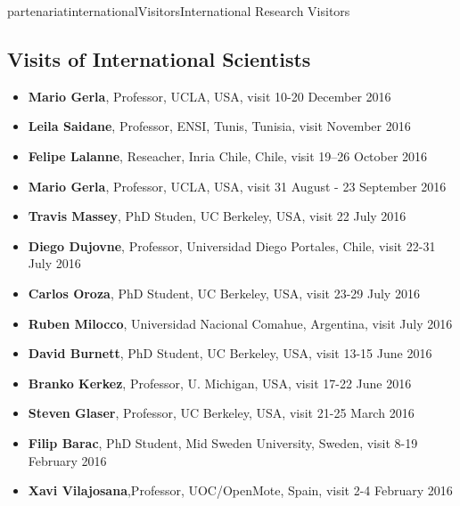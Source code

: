 \documentclass{ra2016}
\begin{document}
\begin{module}{partenariat}{internationalVisitors}{International Research Visitors}


\subsection{Visits of International Scientists}


\begin{itemize}
    \item{\bf Mario Gerla},    Professor,   UCLA,                       USA,       visit 10-20 December 2016
    \item{\bf Leila Saidane},  Professor,   ENSI, Tunis,                Tunisia,   visit November 2016
    \item{\bf Felipe Lalanne}, Reseacher,   Inria Chile,                Chile,     visit 19–26 October 2016
    \item{\bf Mario Gerla},    Professor,   UCLA,                       USA,       visit 31 August - 23 September 2016
    \item{\bf Travis Massey},  PhD Studen,  UC Berkeley,                USA,       visit 22 July 2016
    \item{\bf Diego Dujovne},  Professor,   Universidad Diego Portales, Chile,     visit 22-31 July 2016
    \item{\bf Carlos Oroza},   PhD Student, UC Berkeley,                USA,       visit 23-29 July 2016
    \item{\bf Ruben Milocco},  Universidad Nacional Comahue,            Argentina, visit July 2016
    \item{\bf David Burnett},  PhD Student, UC Berkeley,                USA,       visit 13-15 June 2016
    \item{\bf Branko Kerkez},  Professor,   U. Michigan,                USA,       visit 17-22 June 2016
    \item{\bf Steven Glaser},  Professor,   UC Berkeley,                USA,       visit 21-25 March 2016
    \item{\bf Filip Barac},    PhD Student, Mid Sweden University,      Sweden,    visit 8-19 February 2016
    \item{\bf Xavi Vilajosana},Professor,   UOC/OpenMote,               Spain,     visit 2-4 February 2016
\end{itemize}


\end{module}
\end{document}
